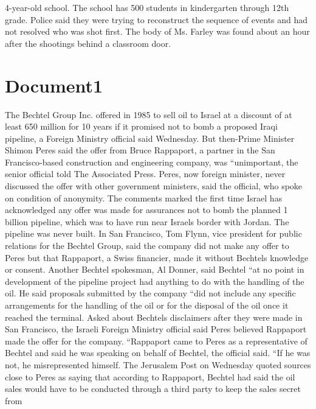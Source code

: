 \documentclass{article}
\begin{document}
4-year-old school. The school has 500 students in kindergarten through 12th grade. Police said they were trying to reconstruct the sequence of events and had not resolved who was shot first. The body of Ms. Farley was found about an hour after the shootings behind a classroom door. 

\color[rgb]{0,0,0}\section{Document1}
\color[rgb]{0.9137254901960784,0.34509803921568627,0.1568627450980392}The Bechtel Group Inc. offered in 1985 to sell \color[rgb]{0.8666666666666667,0.11372549019607843,0.5411764705882353}oil to Israel at a \color[rgb]{0.9647058823529412,0.1568627450980392,0.9411764705882353}discount of at \color[rgb]{0.9137254901960784,0.34509803921568627,0.1568627450980392}least 650 million for 10 years if it promised not to bomb a proposed Iraqi pipeline, a Foreign Ministry official said Wednesday. But then-Prime Minister Shimon Peres said the offer from Bruce Rappaport, a partner in the San Francisco-based construction and engineering company, was ``unimportant, the senior official told The Associated Press. Peres, now foreign minister, never discussed the offer with other government ministers, said the official, who spoke on condition of anonymity. The comments marked the first time Israel has acknowledged any offer was made for assurances not to bomb the planned 1 billion pipeline, which was to have run near Israels border with Jordan. The pipeline was never built. In San Francisco, Tom Flynn, vice president for public relations for the Bechtel Group, said the company did not make any offer to Peres but that Rappaport, a Swiss financier, made it without Bechtels knowledge or consent. Another Bechtel spokesman, Al Donner, said Bechtel ``at no point in development of the pipeline project had anything to do with the handling of the \color[rgb]{0.8666666666666667,0.11372549019607843,0.5411764705882353}oil. He said \color[rgb]{0.9137254901960784,0.34509803921568627,0.1568627450980392}proposals submitted by the company ``did not include any specific arrangements for the handling of the \color[rgb]{0.8666666666666667,0.11372549019607843,0.5411764705882353}oil or for the \color[rgb]{0.9137254901960784,0.34509803921568627,0.1568627450980392}disposal of the \color[rgb]{0.8666666666666667,0.11372549019607843,0.5411764705882353}oil \color[rgb]{0.9137254901960784,0.34509803921568627,0.1568627450980392}once it reached the terminal. Asked about Bechtels disclaimers after they were made in San Francisco, the Israeli Foreign Ministry official said Peres believed Rappaport made the offer for the company. ``Rappaport came to Peres as a representative of Bechtel and said he was speaking on behalf of Bechtel, the official said. ``If he was not, he misrepresented himself. The Jerusalem Post on Wednesday quoted sources close to Peres as saying that according to Rappaport, Bechtel had said the \color[rgb]{0.9647058823529412,0.1568627450980392,0.9411764705882353}oil \color[rgb]{0.9137254901960784,0.34509803921568627,0.1568627450980392}sales would have to be conducted through a third party to keep the sales secret from 
\end{document}
